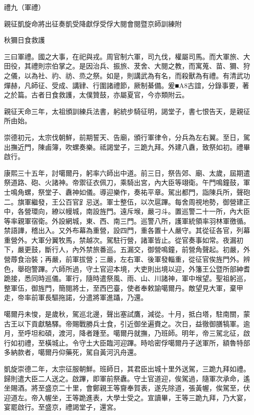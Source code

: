
\begin{pinyinscope}
禮九（軍禮）

親征凱旋命將出征奏凱受降獻俘受俘大閱會閱暨京師訓練附

秋獮日食救護

三曰軍禮。國之大事，在祀與戎。周官制六軍，司九伐，權屬司馬。而大軍旅、大田役，其禮則宗伯掌之。是因治兵、振旅、茇舍、大閱之教，而寓蒐、苗、獮、狩之儀，以為社、礿、祊、烝之祭。如是，則講武為有名，而殺獸為有禮。有清武功燀赫，凡師征、受成、講肄、行圍諸禮節，厥制綦備。爰■A8古誼，分錄事要，著之於篇。古者日食救護，太僕贊鼓，亦屬夏官，今亦類附云。

親征天命三年，太祖頒訓練兵法書，躬統步騎征明，謁堂子，書七恨告天，是親征所由始。

崇德初元，太宗伐朝鮮，前期誓天、告廟，頒行軍律令，分兵為左右翼。至日，駕出撫近門，陳鹵簿，吹螺奏樂。祗謁堂子，三跪九拜。外建八纛，致祭如初。禮畢啟行。

康熙三十五年，討噶爾丹，躬率六師出中道。前三日，祭告郊、廟、太歲，屆期遣祭道路、砲、火諸神。帝禦征衣佩刀，乘騎出宮，內大臣等翊衛。午門鳴鐘鼓，軍士鳴角螺，祭堂子、纛神如儀。導迎樂作，奏祐平章。駕出都門，詣陳兵所，聲砲二。旗軍繼發，王公百官𧾷忌送。軍士整伍，以次扈蹕。每舍周視地勢，御營建正中，各營環向，繚以幔城，南設旌門。遠斥堠，嚴刁斗。置巡警二十一所，內大臣等率親軍宿衛。外設網城，東、西、南三門。巡警八所，護軍統領率羽林軍徼循。禁語譁，稽出入。又外布幕為重營，設四門，重各置十人嚴守。其從征各官，列幕重營外。大軍分翼牧馬，禁越次。駕駐行營，諸軍皆止。從官奏事如常。夜漏初下，嚴更鼓，斷行人，內外禁旅番巡。五漏交，御營鳴鐘，前營角聲起。初嚴，外營蓐食治裝；再嚴，前軍拔營；三嚴，左右軍、後軍發輜重，從征官俟旌門外。辨色，舉砲警蹕。六師所過，守土官迎本境，大吏則出境以迎，外籓王公暨所部紳耆跪接，悉同時巡儀。軍行，隨時遣祭風、雨、山、川諸神，軍中堠望。聖祖躬巡，整軍伍，御旌門，簡閱將士，至西巴臺，使者奉敕諭噶爾丹。敵望見大軍，棄甲走，帝率前軍長驅拖諾，分遣將軍進躡，乃還。

噶爾丹未悛，是歲秋，駕巡北邊，聲出塞試鷹，減從。十月，抵白塔，駐南關，蒙古王以下貢獻駱驛。帝賜戰勝兵士食，引近御坐遍賚之。次日，益徹御膳犒軍。逾月，至呼坦和碩，渡河，降者踵至。噶爾丹就撫，乃班師。明年，帝三駕北征，啟行如初禮，至橫城止。令守土大臣臨河迎蹕。時哈密俘噶爾丹子送軍所，額魯特部多納款者，噶爾丹仰藥死，駕自黃河汎舟還。

凱旋崇德二年，太宗征服朝鮮。班師日，其君臣出城十里外送駕，三跪九拜如禮。歸則遣大臣二人送之。啟蹕，即軍前祭纛。守土官道迎，俟駕過，隨軍次承命，遙坐賜酒。將至盛京二十里，會鄭親王等齎奉賀表，遂先除道，張黃幄，俟駕至，伏迎道左。帝入幄坐，王等跪進表，大學士受之。宣讀畢，王等三跪九拜，乃大宴，宴罷啟行。至盛京，禮謁堂子，還宮。


\end{pinyinscope}
